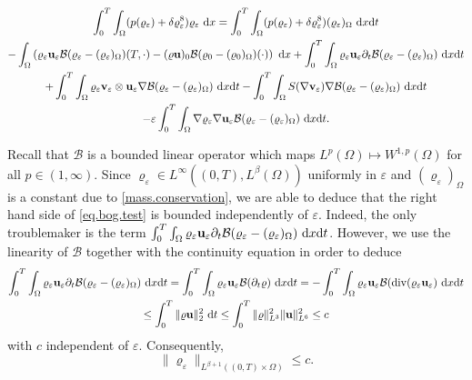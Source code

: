 \documentclass{article}
\DeclareMathOperator{\diver}{div}
\newcommand{\bu}{{\bf u}}
\newcommand{\vu}{\bu}
\newcommand{\bv}{{\bf v}}
\newcommand{\vv}{\bv}
\newcommand{\pat}{\partial_t}
\numberwithin{equation}{section}
\begin{document}
\begin{multline}
\int_0^T\int_\Omega (p(\varrho_\varepsilon) + \delta\varrho_\varepsilon^8)\varrho_\varepsilon\ {\rm d}x = \int_0^T\int_\Omega(p(\varrho_\varepsilon) + \delta\varrho_\varepsilon^8)(\varrho_\varepsilon)_\Omega\ {\rm d}x{\rm d}t \\
%
 -\int_\Omega \left(\varrho_\varepsilon\vu_\varepsilon\mathcal B(\varrho_\varepsilon - (\varrho_\varepsilon)_\Omega)(T,\cdot) - (\varrho\vu)_0\mathcal B(\varrho_0 - (\varrho_0)_\Omega)(\cdot)\right)\ {\rm d}x + \int_0^T\int_\Omega\varrho_\varepsilon\vu_\varepsilon \pat\mathcal B(\varrho_\varepsilon - (\varrho_\varepsilon)_\Omega)\ {\rm d}x{\rm d}t\\
%
 + \int_0^T\int_\Omega \varrho_\varepsilon\vv_\varepsilon\otimes\vu_\varepsilon\nabla\mathcal B(\varrho_\varepsilon - (\varrho_\varepsilon)_{\Omega})\ {\rm d}x{\rm d}t - \int_0^T\int_\Omega S(\nabla\vv_\varepsilon) \nabla \mathcal B(\varrho_\varepsilon - (\varrho_\varepsilon)_\Omega)\ {\rm d}x{\rm d}t\\
%
 - \varepsilon\int_0^T\int_{\Omega} \nabla\varrho_\varepsilon \nabla\vu_\varepsilon \mathcal B(\varrho_\varepsilon - (\varrho_\varepsilon)_\Omega)\ {\rm d}x{\rm d}t.\label{eq.bog.test}
\end{multline}

Recall that $\mathcal B$ is a bounded linear operator which maps $L^p(\Omega)\mapsto W^{1,p}(\Omega)$ for all $p\in (1,\infty)$. Since $\varrho_\varepsilon\in L^\infty((0,T),L^\beta(\Omega))$ uniformly in $\varepsilon$ and $(\varrho_\varepsilon)_{\Omega}$ is a constant due to \eqref{mass.conservation}, we are able to deduce that the right hand side of \eqref{eq.bog.test} is bounded independently of $\varepsilon$. Indeed, the only troublemaker is the term $\int_0^T\int_\Omega \varrho_\varepsilon\vu_\varepsilon\pat\mathcal B(\varrho_\varepsilon - (\varrho_\varepsilon)_{\Omega})\ {\rm d}x{\rm d}t$. However, we use the linearity of $\mathcal B$ together with the continuity equation in order to deduce
\begin{multline*}
\int_0^T\int_\Omega \varrho_\varepsilon\vu_\varepsilon \pat \mathcal B(\varrho_\varepsilon - (\varrho_\varepsilon)_\Omega)\ {\rm d}x{\rm d}t  = \int_0^T\int_\Omega \varrho_\varepsilon \vu_\varepsilon \mathcal B(\pat\varrho)\ {\rm d}x{\rm d}t = -\int_0^T\int_\Omega\varrho_\varepsilon\vu_\varepsilon \mathcal B(\diver(\varrho_\varepsilon\vu_\varepsilon)\ {\rm d}x{\rm d}t\\
 \leq \int_0^T \|\varrho\vu\|_{2}^2\ {\rm d}t\leq \int_0^T \|\varrho\|_{L^3}^2 \|\vu\|_{L^6}^2\leq c
\end{multline*}
with $c$ independent of $\varepsilon$. Consequently, 
\begin{equation}\label{eq.rho.int}
\|\varrho_\varepsilon\|_{L^{\beta+1}((0,T)\times\Omega)}\leq c.
\end{equation}
\end{document}
